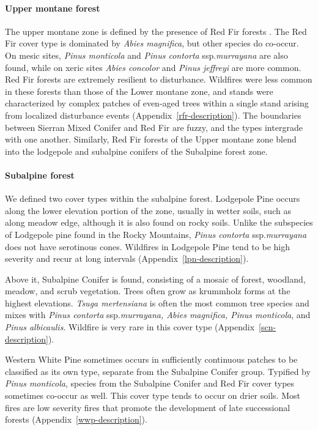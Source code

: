 \paragraph{Upper montane forest} The upper montane zone is defined by the presence of Red Fir forests \citep{Potter1998}. The Red Fir cover type is dominated by \emph{Abies magnifica}, but other species do co-occur. On mesic sites, \emph{Pinus monticola} and \emph{Pinus contorta} ssp.\@ \emph{murrayana} are also found, while on xeric sites \emph{Abies concolor} and \emph{Pinus jeffreyi} are more common. Red Fir forests are extremely resilient to disturbance. Wildfires were less common in these forests than those of the Lower montane zone, and stands were characterized by complex patches of even-aged trees within a single stand arising from localized disturbance events (Appendix~\ref{rfr-description}). The boundaries between Sierran Mixed Conifer and Red Fir are fuzzy, and the types intergrade with one another. Similarly, Red Fir forests of the Upper montane zone blend into the lodgepole and subalpine conifers of the Subalpine forest zone.


\paragraph{Subalpine forest} We defined two cover types within the subalpine forest. Lodgepole Pine occurs along the lower elevation portion of the zone, usually in wetter soils, such as along meadow edge, although it is also found on rocky soils. Unlike the subspecies of Lodgepole pine found in the Rocky Mountains, \emph{Pinus contorta} ssp.\@ \emph{murrayana} does not have serotinous cones. Wildfires in Lodgepole Pine tend to be high severity and recur at long intervals (Appendix~\ref{lpn-description}).%

Above it, Subalpine Conifer is found, consisting of a mosaic of forest, woodland, meadow, and scrub vegetation. Trees often grow as krummholz forms at the highest elevations. \emph{Tsuga mertensiana} is often the most common tree species and mixes with \emph{Pinus contorta} ssp.\@ \emph{murrayana, Abies magnifica, Pinus monticola}, and \emph{Pinus albicaulis}. Wildfire is very rare in this cover type (Appendix~\ref{scn-description}). 

Western White Pine sometimes occurs in sufficiently continuous patches to be classified as its own type, separate from the Subalpine Conifer group. Typified by \emph{Pinus monticola}, species from the Subalpine Conifer and Red Fir cover types sometimes co-occur as well. This cover type tends to occur on drier soils. Most fires are low severity fires that promote the development of late successional forests (Appendix~\ref{wwp-description}).


